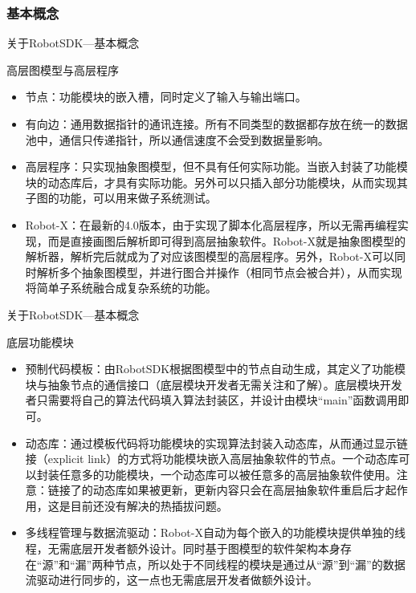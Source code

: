 \documentclass[9pt]{beamer}
\begin{document}
	\subsubsection{基本概念}
	\begin{frame}{关于RobotSDK---基本概念}
		\begin{block}{高层图模型与高层程序}
			\begin{itemize}
				\item<2-> 节点：功能模块的嵌入槽，同时定义了输入与输出端口。
				\item<3-> 有向边：通用数据指针的通讯连接。所有不同类型的数据都存放在统一的数据池中，通信只传递指针，所以通信速度不会受到数据量影响。
				\item<4-> 高层程序：只实现抽象图模型，但不具有任何实际功能。当嵌入封装了功能模块的动态库后，才具有实际功能。另外可以只插入部分功能模块，从而实现其子图的功能，可以用来做子系统测试。
				\item<5-> Robot-X：在最新的4.0版本，由于实现了脚本化高层程序，所以无需再编程实现，而是直接画图后解析即可得到高层抽象软件。Robot-X就是抽象图模型的解析器，解析完后就成为了对应该图模型的高层程序。另外，Robot-X可以同时解析多个抽象图模型，并进行图合并操作（相同节点会被合并），从而实现将简单子系统融合成复杂系统的功能。
			\end{itemize}
		\end{block}
	\end{frame}
	\begin{frame}{关于RobotSDK---基本概念}
		\begin{block}{底层功能模块}
			\begin{itemize}
				\item<2-> 预制代码模板：由RobotSDK根据图模型中的节点自动生成，其定义了功能模块与抽象节点的通信接口（底层模块开发者无需关注和了解）。底层模块开发者只需要将自己的算法代码填入算法封装区，并设计由模块“main”函数调用即可。
				\item<3-> 动态库：通过模板代码将功能模块的实现算法封装入动态库，从而通过显示链接（explicit link）的方式将功能模块嵌入高层抽象软件的节点。一个动态库可以封装任意多的功能模块，一个动态库可以被任意多的高层抽象软件使用。注意：链接了的动态库如果被更新，更新内容只会在高层抽象软件重启后才起作用，这是目前还没有解决的热插拔问题。
				\item<4-> 多线程管理与数据流驱动：Robot-X自动为每个嵌入的功能模块提供单独的线程，无需底层开发者额外设计。同时基于图模型的软件架构本身存在“源”和“漏”两种节点，所以处于不同线程的模块是通过从“源”到“漏”的数据流驱动进行同步的，这一点也无需底层开发者做额外设计。
			\end{itemize}
		\end{block}
	\end{frame}
	
\end{document}
